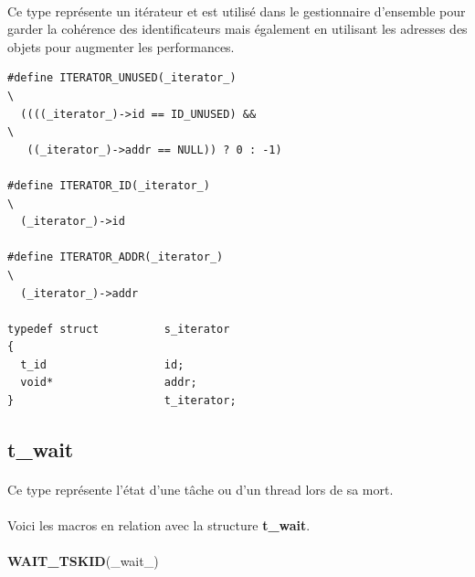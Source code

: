 \documentclass[10pt,a4wide]{article}
\begin{document}
\paragraph{}

Ce type repr\'esente un it\'erateur et est utilis\'e dans le gestionnaire
d'ensemble pour garder la coh\'erence des identificateurs mais \'egalement
en utilisant les adresses des objets pour augmenter les performances.

\begin{verbatim}
#define ITERATOR_UNUSED(_iterator_)                                     \
  ((((_iterator_)->id == ID_UNUSED) &&                                  \
   ((_iterator_)->addr == NULL)) ? 0 : -1)

#define ITERATOR_ID(_iterator_)                                         \
  (_iterator_)->id

#define ITERATOR_ADDR(_iterator_)                                       \
  (_iterator_)->addr

typedef struct          s_iterator
{
  t_id                  id;
  void*                 addr;
}                       t_iterator;
\end{verbatim}

\subsection{t\_wait}

\paragraph{}

Ce type repr\'esente l'\'etat d'une t\^ache ou d'un thread lors de sa mort.

\paragraph{}

Voici les macros en relation avec la structure \textbf{t\_wait}.

\paragraph{}

\hspace{1.5cm}\textbf{WAIT\_TSKID}(\_wait\_)

\paragraph{}
\end{document}
